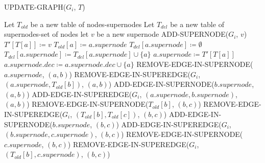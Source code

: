 \begin{algorithm}[H] \scriptsize
    \caption{UPDATE-GRAPH($G_i$, $T$)}\label{alg:update-graph}
    \begin{algorithmic}[1]
        \State Let $T_{old}$ be a new table of nodes-supernodes
        \State Let $T_{del}$ be a new table of supernodes-set of nodes
                \State let $v$ be a new supernode
                \State ADD-SUPERNODE($G_i$, $v$)
                \State $T'[T[a]] \coloneqq v$
            \EndIf
            \State $T_{old}[a] \coloneqq a.supernode$
                \State $T_{del}[a.supernode] \coloneqq \emptyset$
            \EndIf
            \State $T_{del}[a.supernode] \coloneqq T_{del}[a.supernode] \cup \{a\}$
            \State $a.supernode \coloneqq T'[T[a]]$
            \State $a.supernode.dec \coloneqq a.supernode.dec \cup \{a\}$
        \EndFor
                        \State REMOVE-EDGE-IN-SUPERNODE($a.supernode$, $(a,b)$)
                    \Else
                        \State REMOVE-EDGE-IN-SUPEREDGE($G_i$, $(a.supernode, T_{old}[b])$, $(a,b)$)
                    \EndIf
                        \State ADD-EDGE-IN-SUPERNODE($b.supernode$, $(a,b)$)
                    \Else
                        \State ADD-EDGE-IN-SUPEREDGE($G_i$, $(a.supernode, b.supernode)$, $(a,b)$)
                    \EndIf
                \EndIf
            \EndFor
                        \State REMOVE-EDGE-IN-SUPERNODE($T_{old}[b]$, $(b,c)$)
                    \Else
                        \State REMOVE-EDGE-IN-SUPEREDGE($G_i$, $(T_{old}[b], T_{old}[c])$, $(b,c)$)
                    \EndIf
                        \State ADD-EDGE-IN-SUPERNODE($b.supernode$, $(b,c)$)
                    \Else
                        \State ADD-EDGE-IN-SUPEREDGE($G_i$, $(b.supernode, c.supernode)$, $(b,c)$)
                    \EndIf
                \Else
                        \State REMOVE-EDGE-IN-SUPERNODE($c.supernode$, $(b,c)$)
                    \Else
                        \State REMOVE-EDGE-IN-SUPEREDGE($G_i$, $(T_{old}[b], c.supernode)$, $(b,c)$)

\end{algorithmic}
\end{algorithm}
